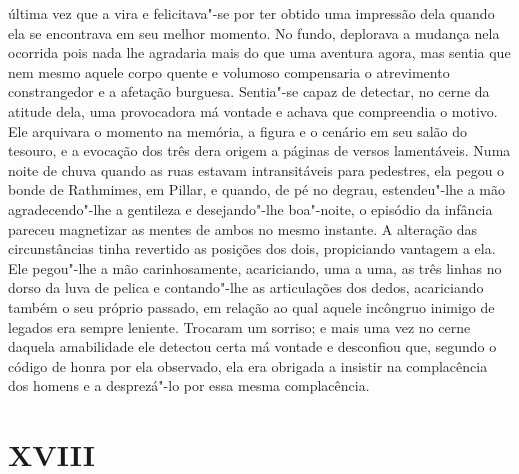 última vez que a vira e felicitava"-se por ter obtido uma impressão dela
quando ela se encontrava em seu melhor momento.  No fundo, deplorava a
mudança nela ocorrida pois nada lhe agradaria mais do que uma aventura
agora, mas sentia que nem mesmo aquele corpo quente e volumoso
compensaria o atrevimento constrangedor e a afetação burguesa.
\label{sentia"-se"-capaz} Sentia"-se capaz de detectar, no cerne da atitude dela, uma provocadora
má vontade e achava que compreendia o motivo.  Ele arquivara o momento
na memória, a figura e o cenário em seu salão do tesouro, e a evocação
dos três dera origem a páginas de \label{versos"-lamentaveis} versos lamentáveis.  Numa noite de
chuva quando as ruas estavam intransitáveis para pedestres, ela pegou o
bonde de Rathmimes, em Pillar, e quando, de pé no degrau, estendeu"-lhe
a mão agradecendo"-lhe a gentileza e desejando"-lhe boa"-noite, o
\label{episodio"-da} episódio da infância pareceu magnetizar as mentes de ambos no mesmo
instante.  A alteração das circunstâncias tinha revertido as posições
dos dois, propiciando vantagem a ela.  Ele pegou"-lhe a mão
carinhosamente, acariciando, uma a uma, as três linhas no \label{dorso"-da} dorso da
luva de pelica e contando"-lhe as articulações dos dedos, acariciando
também o seu próprio passado, em relação ao qual aquele incôngruo
inimigo de legados era sempre leniente.  Trocaram um
sorriso; e mais uma vez no cerne daquela amabilidade ele detectou certa
má vontade e desconfiou que, segundo o código de honra por ela
observado, ela era obrigada a insistir na complacência dos homens e a
desprezá"-lo por essa mesma complacência.


\section{XVIII}

